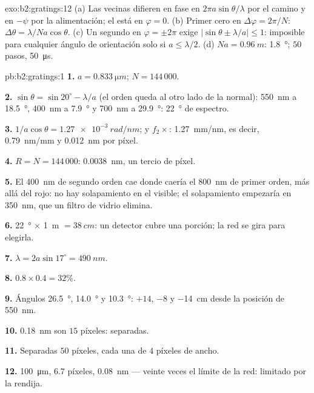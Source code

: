 \begin{solution}{exo:b2:gratings:12}
(a) Las vecinas difieren en fase en $2\pi a\sin\theta/\lambda$ por el camino y en $-\psi$
por la alimentación; el  está en $\varphi = 0$. (b) Primer cero en
$\Delta\varphi = 2\pi/N$: $\Delta\theta = \lambda/Na\cos\theta$. (c) Un segundo  en
$\varphi = \pm2\pi$ exige $|\sin\theta \pm \lambda/a| \le 1$: imposible para cualquier ángulo de
orientación solo si $a \le \lambda/2$. (d) $Na = \qty{0.96}{m}$: \qty{1.8}{\degree}; $50$ pasos,
\qty{50}{\micro s}.
\end{solution}

\begin{solution}{pb:b2:gratings:1}
\textbf{1.} $a = \qty{0.833}{\micro m}$; $N = 144\,000$.

\textbf{2.} $\sin\theta = \sin20^\circ - \lambda/a$ (el orden queda al otro lado de
la normal): \qty{550}{nm} a \qty{18.5}{\degree}, \qty{400}{nm} a \qty{7.9}{\degree} y \qty{700}{nm} a
\qty{29.9}{\degree}: \qty{22}{\degree} de espectro.

\textbf{3.} $1/a\cos\theta = \qty{1.27e-3}{rad/nm}$; y $f_2\times$: \qty{1.27}{mm/nm}, es decir,
\qty{0.79}{nm/mm} y \qty{0.012}{nm} por píxel.

\textbf{4.} $R = N = 144\,000$: \qty{0.0038}{nm}, un tercio de píxel.

\textbf{5.} El \qty{400}{nm} de segundo orden cae donde caería el \qty{800}{nm}
de primer orden, más allá del rojo: no hay solapamiento en el visible; el solapamiento
empezaría en \qty{350}{nm}, que un filtro de vidrio elimina.

\textbf{6.} \qty{22}{\degree} $\times$ \qty{1}{m} $= \qty{38}{cm}$: un detector cubre una porción;
la red se gira para elegirla.

\textbf{7.} $\lambda = 2a\sin17^\circ = \qty{490}{nm}$.

\textbf{8.} $0.8 \times 0.4 = 32\%$.

\textbf{9.} Ángulos \qty{26.5}{\degree}, \qty{14.0}{\degree} y \qty{10.3}{\degree}: $+14$, $-8$ y
\qty{-14}{cm} desde la posición de \qty{550}{nm}.

\textbf{10.} \qty{0.18}{nm} son $15$ píxeles: separadas.

\textbf{11.} Separadas $50$ píxeles, cada una de $4$ píxeles de ancho.

\textbf{12.} \qty{100}{\micro m}, $6.7$ píxeles, \qty{0.08}{nm} --- veinte veces el
límite de la red: limitado por la rendija.


\end{solution}
